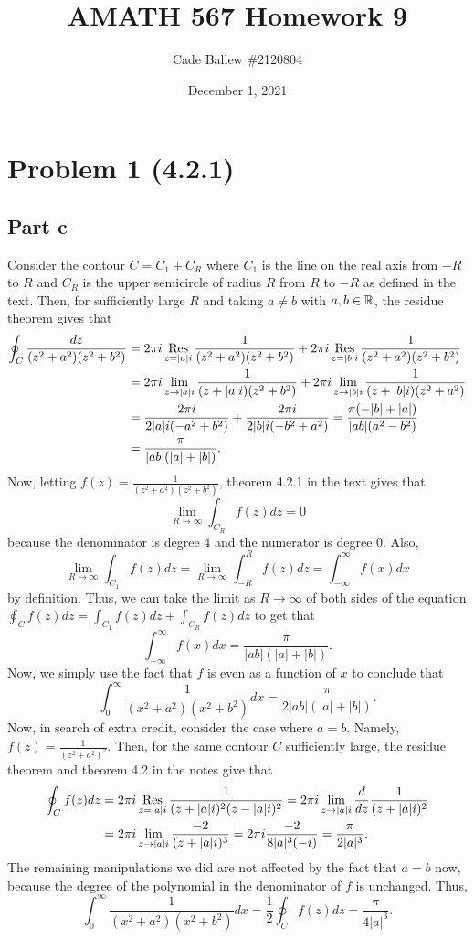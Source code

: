 \documentclass{article}
\title{AMATH 567 Homework 9}
\author{Cade Ballew \#2120804}
\date{December 1, 2021}
\begin{document}
\maketitle

\section{Problem 1 (4.2.1)}
\subsection{Part c}
Consider the contour $C=C_1+C_R$ where $C_1$ is the line on the real axis from $-R$ to $R$ and $C_R$ is the upper semicircle of radius $R$ from $R$ to $-R$ as defined in the text. Then, for sufficiently large $R$ and taking $a\neq b$ with $a,b\in\mathbb{R}$, the residue theorem gives that 
\begin{align*}
\oint_C\frac{dz}{(z^2 + a^2)(z^2 + b^2)}&=2\pi i\operatorname*{Res}_{z=|a|i}\frac{1}{(z^2 + a^2)(z^2 + b^2)}+2\pi i\operatorname*{Res}_{z=|b|i}\frac{1}{(z^2 + a^2)(z^2 + b^2)}\\&=
2\pi i\lim_{z\to|a|i}\frac{1}{(z + |a|i)(z^2 + b^2)}+2\pi i\lim_{z\to|b|i}\frac{1}{(z + |b|i)(z^2 + a^2)}\\&=
\frac{2\pi i}{2|a|i(-a^2 + b^2)}+\frac{2\pi i}{2|b|i(-b^2 + a^2)}=\frac{\pi(-|b|+|a|)}{|ab|(a^2-b^2)}\\&=
\frac{\pi}{|ab|(|a|+|b|)}.
\end{align*}
Now, letting $f(z)=\frac{1}{(z^2 + a^2)(z^2 + b^2)}$, theorem 4.2.1 in the text gives that 
\[
\lim_{R\to\infty}\int_{C_R}f(z)dz=0
\]
because the denominator is degree 4 and the numerator is degree 0. Also,
\[
\lim_{R\to\infty}\int_{C_1}f(z)dz=\lim_{R\to\infty}\int_{-R}^Rf(z)dz=\int_{-\infty}^\infty f(x)dx
\]
by definition. Thus, we can take the limit as $R\to\infty$ of both sides of the equation $\oint_{C}f(z)dz=\int_{C_1}f(z)dz+\int_{C_R}f(z)dz$ to get that 
\[
\int_{-\infty}^\infty f(x)dx = \frac{\pi}{|ab|(|a|+|b|)}.
\]
Now, we simply use the fact that $f$ is even as a function of $x$ to conclude that 
\[
\int_{0}^\infty \frac{1}{(x^2 + a^2)(x^2 + b^2)}dx = \frac{\pi}{2|ab|(|a|+|b|)}.
\]
Now, in search of extra credit, consider the case where $a=b$. Namely, $f(z)=\frac{1}{(z^2+a^2)^2}$. Then, for the same contour $C$ sufficiently large, the residue theorem and theorem 4.2 in the notes give that 
\begin{align*}
\oint_Cf(z)dz&=2\pi i\operatorname*{Res}_{z=|a|i}\frac{1}{(z+|a|i)^2(z-|a|i)^2}=2\pi i\lim_{z\to|a|i}\frac{d}{dz}\frac{1}{(z+|a|i)^2}\\&=2\pi i\lim_{z\to|a|i}\frac{-2}{(z+|a|i)^3}=2\pi i\frac{-2}{8|a|^3(-i)}=\frac{\pi}{2|a|^3}.
\end{align*}
The remaining manipulations we did are not affected by the fact that $a=b$ now, because the degree of the polynomial in the denominator of $f$ is unchanged. Thus, 
\[
\int_{0}^\infty \frac{1}{(x^2 + a^2)(x^2 + b^2)}dx =\frac{1}{2}\oint_Cf(z)dz=\frac{\pi}{4|a|^3}.
\]
\end{document}
